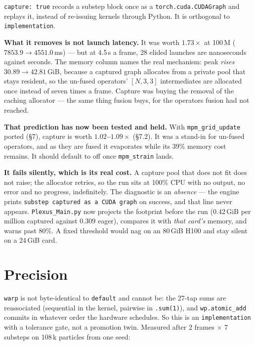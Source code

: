 \documentclass[11pt,a4paper]{article}
\newcommand{\code}[1]{\texttt{\small #1}}
\newcommand{\gd}[1]{\textcolor{good}{\textbf{#1}}}
\begin{document}
\code{capture: true} records a substep block once as a \code{torch.cuda.CUDAGraph} and replays it,
instead of re-issuing kernels through Python. It is orthogonal to \code{implementation}.

\textbf{What it removes is not launch latency.} It was worth $1.73\times$ at 100\,M
($7853.9\to4551.0$\,ms) --- but at 4.5\,s a frame, 28 elided launches are nanoseconds against
seconds. The memory column names the real mechanism: peak \emph{rises} $30.89\to42.81$\,GiB, because
a captured graph allocates from a private pool that stays resident, so the un-fused operators'
$[N,3,3]$ intermediates are allocated once instead of seven times a frame. Capture was buying the
removal of the caching allocator --- the same thing fusion buys, for the operators fusion had not
reached.

\textbf{That prediction has now been tested and held.} With \code{mpm\_grid\_update} ported (\S7),
capture is worth \gd{$1.02$--$1.09\times$} (\S7.2). It was a stand-in for un-fused operators, and as
they are fused it evaporates while its 39\% memory cost remains. It should default to off once
\code{mpm\_strain} lands.

\textbf{It fails silently, which is its real cost.} A capture pool that does not fit does not raise;
the allocator retries, so the run sits at 100\% CPU with no output, no error and no progress,
indefinitely. The diagnostic is an \emph{absence} --- the engine prints \code{substep captured as a
CUDA graph} on success, and that line never appears. \code{Plexus\_Main.py} now projects the
footprint before the run (0.42\,GiB per million captured against 0.309 eager), compares it with
\emph{that card's} memory, and warns past 80\%. A fixed threshold would nag on an 80\,GiB H100 and
stay silent on a 24\,GiB card.

\section{Precision}

\code{warp} is not byte-identical to \code{default} and cannot be: the 27-tap sums are reassociated
(sequential in the kernel, pairwise in \code{.sum(1)}), and \code{wp.atomic\_add} commits in whatever
order the hardware schedules. So this is an \code{implementation} with a tolerance gate, not a
promotion twin. Measured after 2 frames $\times$ 7 substeps on 108\,k particles from one seed:
\end{document}
